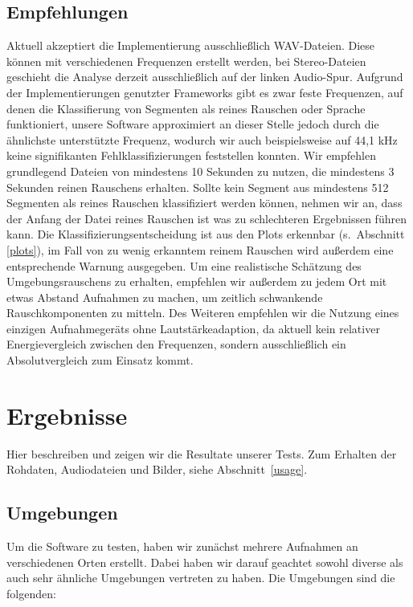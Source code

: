\documentclass[
	fontsize=10.5pt,
	marginpar=false,
	ngerman,
	accentcolor=3d
	]{tudapub}
\begin{document}

\subsection{Empfehlungen}
Aktuell akzeptiert die Implementierung ausschließlich WAV-Dateien. Diese können mit verschiedenen Frequenzen erstellt werden, bei Stereo-Dateien geschieht die Analyse derzeit ausschließlich auf der linken Audio-Spur. Aufgrund der Implementierungen genutzter Frameworks gibt es zwar feste Frequenzen, auf denen die Klassifierung von Segmenten als reines Rauschen oder Sprache funktioniert, unsere Software approximiert an dieser Stelle jedoch durch die ähnlichste unterstützte Frequenz, wodurch wir auch beispielsweise auf 44,1 kHz keine signifikanten Fehlklassifizierungen feststellen konnten. Wir empfehlen grundlegend Dateien von mindestens 10 Sekunden zu nutzen, die mindestens 3 Sekunden reinen Rauschens erhalten. Sollte kein Segment aus mindestens 512 Segmenten als reines Rauschen klassifiziert werden können, nehmen wir an, dass der Anfang der Datei reines Rauschen ist was zu schlechteren Ergebnissen führen kann. Die Klassifizierungsentscheidung ist aus den Plots erkennbar (s.~Abschnitt \ref{plots}), im Fall von zu wenig erkanntem reinem Rauschen wird außerdem eine entsprechende Warnung ausgegeben. Um eine realistische Schätzung des Umgebungsrauschens zu erhalten, empfehlen wir außerdem zu jedem Ort mit etwas Abstand Aufnahmen zu machen, um zeitlich schwankende Rauschkomponenten zu mitteln. Des Weiteren empfehlen wir die Nutzung eines einzigen Aufnahmegeräts ohne Lautstärkeadaption, da aktuell kein relativer Energievergleich zwischen den Frequenzen, sondern ausschließlich ein Absolutvergleich zum Einsatz kommt.

\pagebreak
{}
\section{Ergebnisse}
\label{reults}

Hier beschreiben und zeigen wir die Resultate unserer Tests. Zum Erhalten der Rohdaten, Audiodateien und Bilder, siehe Abschnitt~\ref{usage}.

\subsection{Umgebungen}
\label{envs}

Um die Software zu testen, haben wir zunächst mehrere Aufnahmen an verschiedenen Orten erstellt. Dabei haben wir darauf geachtet sowohl diverse als auch sehr ähnliche Umgebungen vertreten zu haben. Die Umgebungen sind die folgenden:
\end{document}
